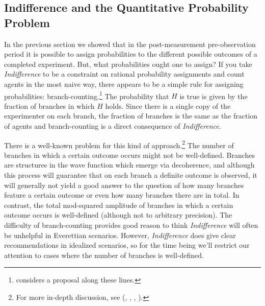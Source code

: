 \documentclass[12pt,onecolumn,secnumarabic,amsmath,amssymb,balancelastpage,nofootinbib]{article}
\begin{document}
\subsection{Indifference and the Quantitative Probability Problem}\label{quant}

In the previous section we showed that in the post-measurement pre-observation period it is possible to assign probabilities to the different possible outcomes of a completed experiment.  But, what probabilities ought one to assign?  If you take \emph{Indifference} to be a constraint on rational probability assignments and count agents in the most naive way, there appears to be a simple rule for assigning probabilities: branch-counting.\footnote{\citet{lewis2009} considers a proposal along these lines.}  The probability that $H$ is true is given by the fraction of branches in which $H$ holds.  Since there is a single copy of the experimenter on each branch, the fraction of branches is the same as the fraction of agents and branch-counting is a direct consequence of \emph{Indifference}.

There is a well-known problem for this kind of approach.\footnote{For more in-depth discussion, see \citeauthor{wallace2007} (\citeyear{wallace2007}, , \citeyear{wallace2012}, ).}  The number of branches in which a certain outcome occurs might not be well-defined.  Branches are structures in the wave function which emerge via decoherence, and although this process will guarantee that on each branch a definite outcome is observed, it will generally not yield a good answer to the question of how many branches feature a certain outcome or even how many branches there are in total.  In contrast, the total mod-squared amplitude of branches in which a certain outcome occurs is well-defined (although not to arbitrary precision).  The difficulty of branch-counting provides good reason to think \emph{Indifference} will often be unhelpful in Everettian scenarios.  However, \emph{Indifference} does give clear recommendations in idealized scenarios, so for the time being we'll restrict our attention to cases where the number of branches is well-defined.
\end{document}
